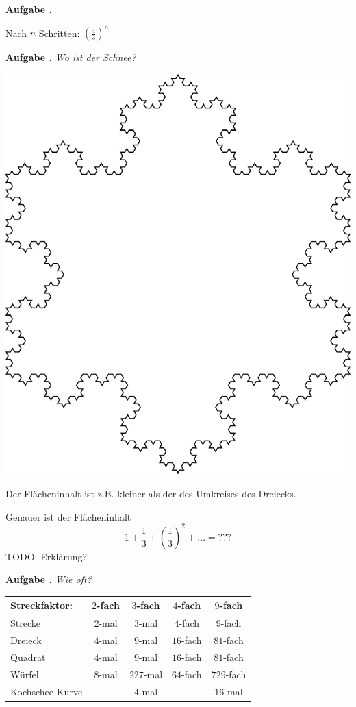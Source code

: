 \documentclass[a4paper,ngerman,12pt]{scrartcl}
\theoremstyle{definition}
\theoremstyle{plain}
\theoremstyle{remark}
\newlength{\aufgabenskip}
\newcounter{aufgabennummer}
\newenvironment{aufgabe}[1]{
  \addtocounter{aufgabennummer}{1}
  \textbf{Aufgabe \theaufgabennummer.} \emph{#1} \par
}{\vspace{\aufgabenskip}}
\begin{document}
\begin{aufgabe}{}
	Nach $n$ Schritten: $\left(\frac{4}{3}\right)^n$
\end{aufgabe}

\begin{aufgabe}{Wo ist der Schnee?}
	\begin{center}
		\includegraphics[width=.6\textwidth]{Bilder/Schneeflocke.pdf}
	\end{center}	
Der Flächeninhalt ist z.B. kleiner als der des Umkreises des Dreiecks. 

Genauer ist der Flächeninhalt 
\[1 + \frac{1}{3} + \left(\frac{1}{3}\right)^2 + \dots = ???\]
TODO: Erklärung?
\end{aufgabe}

\begin{aufgabe}{Wie oft?}\label{aufgabe:Wie_oft}
\begin{center}
	\renewcommand{\arraystretch}{2}
	\begin{tabular}{l||c|c|c|c}
		Streckfaktor:& $2$-fach & $3$-fach & $4$-fach & $9$-fach \\\hline\hline
		Strecke      & $2$-mal	& $3$-mal  & $4$-fach & $9$-fach \\\hline
		Dreieck      & $4$-mal  & $9$-mal  & $16$-fach & $81$-fach \\\hline
		Quadrat      & $4$-mal  & $9$-mal  & $16$-fach & $81$-fach  \\\hline
		Würfel       & $8$-mal  & $227$-mal  & $64$-fach & $729$-fach  \\\hline
		Kochschee Kurve & ---   & $4$-mal  & ---      & $16$-mal  \\      	
	\end{tabular}
\end{center}
\end{aufgabe}
\end{document}
